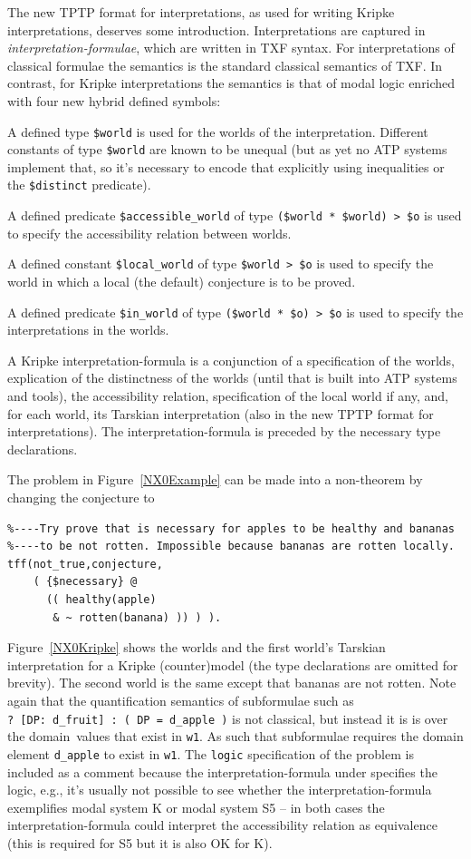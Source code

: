 \documentclass{ceurart}
\newenvironment{packed_itemize}{
\vspace*{-0.5em}
\begin{itemize}
\setlength{\partopsep}{0pt}
\setlength{\itemsep}{1pt}
\setlength{\parskip}{0pt}
\setlength{\parsep}{0pt}
}{\end{itemize}}
\begin{document}
The new TPTP format for interpretations, as used for writing Kripke interpretations, deserves 
some introduction.
Interpretations are captured in {\em interpretation-formulae}, which are written in TXF syntax.
For interpretations of classical formulae the semantics is the standard classical semantics of 
TXF.
In contrast, for Kripke interpretations the semantics is that of modal logic enriched with four 
new hybrid defined symbols:
\begin{packed_itemize}
\item A defined type {\tt \$world} is used for the worlds of the interpretation.
      Different constants of type {\tt \$world} are known to be unequal (but as yet no ATP 
      systems implement that, so it's necessary to encode that explicitly using inequalities or 
      the {\tt \$distinct} predicate).
\item A defined predicate {\tt \$accessible\_world} of type {\tt (\$world~*~\$world)~>~\$o}
      is used to specify the accessibility relation between worlds.
\item A defined constant {\tt \$local\_world} of type {\tt \$world~>~\$o} is used to specify 
      the world in which a local (the default) conjecture is to be proved. 
\item A defined predicate {\tt \$in\_world} of type {\tt (\$world~*~\$o)~>~\$o} is used to 
      specify the interpretations in the worlds.
\end{packed_itemize}
A Kripke interpretation-formula is a conjunction of 
a specification of the worlds,
explication of the distinctness of the worlds (until that is built into ATP systems and tools),
the accessibility relation,
specification of the local world if any,
and,
for each world, its Tarskian interpretation (also in the new TPTP format for interpretations).
The interpretation-formula is preceded by the necessary type declarations.

The problem in Figure~\ref{NX0Example} can be made into a non-theorem by changing the conjecture
to
\begin{verbatim}
%----Try prove that is necessary for apples to be healthy and bananas 
%----to be not rotten. Impossible because bananas are rotten locally.
tff(not_true,conjecture,
    ( {$necessary} @
      (( healthy(apple)
       & ~ rotten(banana) )) ) ).
\end{verbatim}
Figure~\ref{NX0Kripke} shows the worlds and the first world's Tarskian interpretation for 
a Kripke (counter)model (the type declarations are omitted for brevity).
The second world is the same except that bananas are not rotten.
Note again that the quantification semantics of subformulae such as 
{\tt ?~[DP:~d\_fruit]~:~(~DP~=~d\_apple~)}
is not classical, but instead it is is over the domain values that exist in {\tt w1}.
As such that subformulae requires the domain element {\tt d\_apple} to exist in {\tt w1}.
The {\tt logic} specification of the problem is included as a comment because the
interpretation-formula under specifies the logic, e.g., it's usually not possible to see whether
the interpretation-formula exemplifies modal system K or modal system S5 -- in both cases the
interpretation-formula could interpret the accessibility relation as equivalence (this is 
required for S5 but it is also OK for K).
\end{document}
